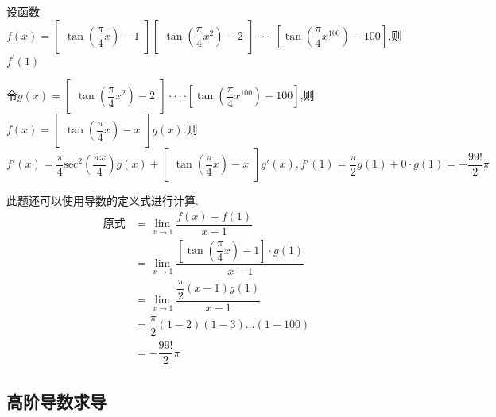 \documentclass[8pt a4paper, oneside, UTF8]{ctexbook}  %
\begin{document}
\begin{sloppypar}
\begin{note}
    \end{note}
    \begin{problem}
    设函数 $f(x)=\begin{bmatrix}\tan\left(\dfrac{\pi}{4}x\right)-1\end{bmatrix}\begin{bmatrix}\tan\left(\dfrac{\pi}{4}x^{2}\right)-2\end{bmatrix}\cdotp\cdotp\cdotp\cdotp\left[\tan\left(\dfrac{\pi}{4}x^{100}\right)-100\right]$,则 $f^\prime(1)$
    \end{problem}
    \begin{solution}
        令$g(x)=\begin{bmatrix}\tan\left(\dfrac{\pi}{4}x^{2}\right)-2\end{bmatrix}\cdotp\cdotp\cdotp\cdotp\left[\tan\left(\dfrac{\pi}{4}x^{100}\right)-100\right]$,则$f(x)=\begin{bmatrix}\tan(\dfrac{\pi}{4}x)-x\end{bmatrix}g(x)$.则 $f'(x)=\dfrac\pi4\mathrm{sec}^2\left(\dfrac{\pi x}4\right)g(x)+\begin{bmatrix}\tan(\dfrac{\pi}{4}x)-x\end{bmatrix}g'(x),f'(1)=\dfrac{\pi}{2}g(1) + 0 \cdot g(1) = -\dfrac{99!}{2}\pi$
    \end{solution}
    \begin{note}
        此题还可以使用导数的定义式进行计算.
        \begin{align*}
            \text{原式} & = \lim_{x\to1}\dfrac{f(x)-f(1)}{x-1}                           \\
                      & = \lim_{x\to1}\dfrac{[\tan(\dfrac{\pi}{4}x)-1]\cdot g(1)}{x-1} \\
                      & = \lim_{x \to 1}\dfrac{\dfrac{\pi}{2}(x-1)g(1)}{x-1}           \\
                      & = \dfrac{\pi}{2}(1-2)(1-3)\dots(1-100)                         \\
                      & = -\dfrac{99!}{2}\pi
        \end{align*}
    \end{note}
    \subsection{高阶导数求导}

\end{sloppypar}
\end{document}
